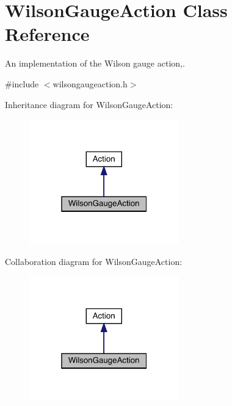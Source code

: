 \hypertarget{class_wilson_gauge_action}{}\section{Wilson\+Gauge\+Action Class Reference}
\label{class_wilson_gauge_action}


An implementation of the Wilson gauge action,.  




{\ttfamily \#include $<$wilsongaugeaction.\+h$>$}



Inheritance diagram for Wilson\+Gauge\+Action\+:
\nopagebreak
\begin{figure}[H]
\begin{center}
\leavevmode
\includegraphics[width=184pt]{class_wilson_gauge_action__inherit__graph}
\end{center}
\end{figure}


Collaboration diagram for Wilson\+Gauge\+Action\+:
\nopagebreak
\begin{figure}[H]
\begin{center}
\leavevmode
\includegraphics[width=184pt]{class_wilson_gauge_action__coll__graph}
\end{center}
\end{figure}

